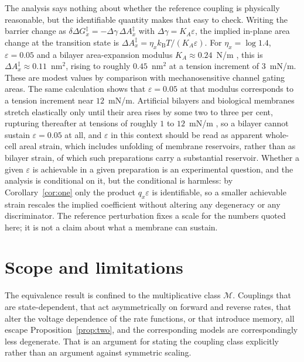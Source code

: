 \begin{remark}
The analysis says nothing about whether the reference coupling is physically
reasonable, but the identifiable quantity makes that easy to check. Writing the
barrier change as $\delta\Delta G_x^{\ddagger}=-\Delta\gamma\,\Delta
A_x^{\ddagger}$ with $\Delta\gamma=K_A\varepsilon$, the implied in-plane area
change at the transition state is
$\Delta A_x^{\ddagger}=\eta_x k_{\mathrm B}T/(K_A\varepsilon)$. For
$\eta_x=\log 1.4$, $\varepsilon=0.05$ and a bilayer area-expansion modulus
$K_A\approx0.24$~N/m \citep{evans1987}, this is $\Delta A_x^{\ddagger}\approx
0.11$~nm$^2$, rising to roughly $0.45$~nm$^2$ at a tension increment of
$3$~mN/m. These are modest values by comparison with mechanosensitive channel
gating areas. The same calculation shows that $\varepsilon=0.05$ at that modulus
corresponds to a tension increment near $12$~mN/m. Artificial bilayers and
biological membranes stretch elastically only until their area rises by some two
to three per cent, rupturing thereafter at tensions of roughly $1$ to
$12$~mN/m \citep{morris2001}, so a bilayer cannot sustain $\varepsilon=0.05$ at
all, and $\varepsilon$ in this context should be read as apparent whole-cell
areal strain, which includes unfolding of membrane reservoirs, rather than as
bilayer strain, of which such
preparations carry a substantial reservoir. Whether a given $\varepsilon$ is achievable in a given
preparation is an experimental question, and the analysis is conditional on it,
but the conditional is harmless: by Corollary~\ref{cor:one} only the product
$q_x\varepsilon$ is identifiable, so a smaller achievable strain rescales the
implied coefficient without altering any degeneracy or any discriminator. The
reference perturbation fixes a scale for the numbers quoted here; it is not a
claim about what a membrane can sustain.
\end{remark}

\section{Scope and limitations}

The equivalence result is confined to the multiplicative class $\mathcal{M}$.
Couplings that are state-dependent, that act asymmetrically on forward and
reverse rates, that alter the voltage dependence of the rate functions, or that
introduce memory, all escape Proposition~\ref{prop:two}, and the corresponding
models are correspondingly less degenerate. That is an argument for stating the
coupling class explicitly rather than an argument against symmetric scaling.

